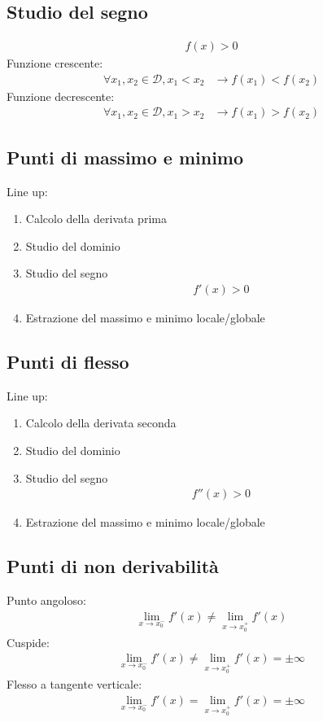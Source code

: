 \documentclass[a4paper]{article}
\begin{document}
		\subsection{Studio del segno}
		\begin{align*}
			f(x) > 0
		\end{align*}
		Funzione crescente:
		\begin{align*}
			\forall x_1,x_2 \in \mathcal{D}, x_1 < x_2 &\to f(x_1)<f(x_2)
		\end{align*}
		Funzione decrescente:
		\begin{align*}
			\forall x_1,x_2 \in \mathcal{D}, x_1 > x_2 &\to f(x_1)>f(x_2)
		\end{align*}

		\subsection{Punti di massimo e minimo}
		Line up:
		\begin{enumerate}
			\item Calcolo della derivata prima
			\item Studio del dominio
			\item Studio del segno
			\begin{align*}
				f'(x) > 0
			\end{align*}
			\item Estrazione del massimo e minimo locale/globale 
		\end{enumerate}
		
		
		\subsection{Punti di flesso}
		Line up:
		\begin{enumerate}
			\item Calcolo della derivata seconda
			\item Studio del dominio
			\item Studio del segno
			\begin{align*}
			f''(x) > 0
			\end{align*}
			\item Estrazione del massimo e minimo locale/globale 
		\end{enumerate}		
	\newpage
	\subsection{Punti di non derivabilità}
	Punto angoloso:
	\begin{align*}
		\lim\limits_{x \to x_0^-}f'(x) \ne \lim\limits_{x \to x_0^+}f'(x)
	\end{align*}
	Cuspide:
	\begin{align*}
		\lim\limits_{x \to x_0^-}f'(x) \ne \lim\limits_{x \to x_0^+}f'(x) = \pm \infty
	\end{align*}
	Flesso a tangente verticale:
	\begin{align*}
		\lim\limits_{x \to x_0^-}f'(x) = \lim\limits_{x \to x_0^+}f'(x) = \pm \infty
	\end{align*}
	
\end{document}
